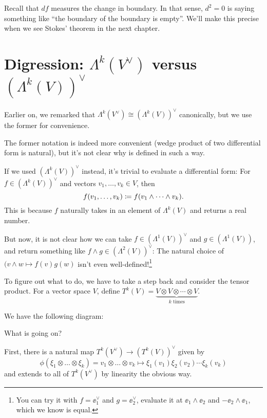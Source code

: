 Recall that $df$ measures the change in boundary.
In that sense, $d^2 = 0$ is saying something like
``the boundary of the boundary is empty''.
We'll make this precise when we see Stokes' theorem in the next chapter.

\section{Digression: $\Lambda^k(V^\vee)$ versus $(\Lambda^k(V))^\vee$}
\label{sec:wedge_product_dual}

Earlier on, we remarked that $\Lambda^k(V^\vee) \cong (\Lambda^k(V))^\vee$ canonically, but we
use the former for convenience.

The former notation is indeed more convenient (wedge product of
two differential form is natural), but it's not clear why  is
defined in such a way.

If we used $(\Lambda^k(V))^\vee$ instead, it's trivial to evaluate a differential form:
For $f \in (\Lambda^k(V))^\vee$ and vectors $v_1, \dots, v_k \in V$, then
\[
	f(v_1, \dots, v_k) \coloneqq f(v_1 \wedge \dots \wedge v_k).
\]
This is because $f$ naturally takes in an element of $\Lambda^k(V)$ and returns a real number.

But now, it is not clear how we can take $f \in (\Lambda^1(V))^\vee$ and $g \in (\Lambda^1(V))$, and
return something like $f \wedge g \in (\Lambda^2(V))^\vee$: The natural choice of $(v \wedge w
\mapsto f(v) g(w)$ isn't even well-defined!\footnote{You can try it with $f = \ee_1^\vee$ and
$g = \ee_2^\vee$, evaluate it at $\ee_1 \wedge \ee_2$ and $-\ee_2 \wedge \ee_1$,
which we know is equal.}

To figure out what to do, we have to take a step back and consider the tensor product.
For a vector space $V$,
define $T^k(V) = \underbrace{V \otimes V \otimes \cdots \otimes V}_{\text{$k$ times}}$.

We have the following diagram:
\begin{center}
\end{center}

What is going on?

First, there is a natural map $T^k(V^\vee) \to (T^k(V))^\vee$ given by
\[ \phi(\xi_1 \otimes \dots \otimes \xi_k) = v_1 \otimes \dots \otimes v_k \mapsto
\xi_1(v_1) \xi_2(v_2) \dotsm \xi_k(v_k) \]
and extends to all of $T^k(V^\vee)$ by linearity the obvious way.

